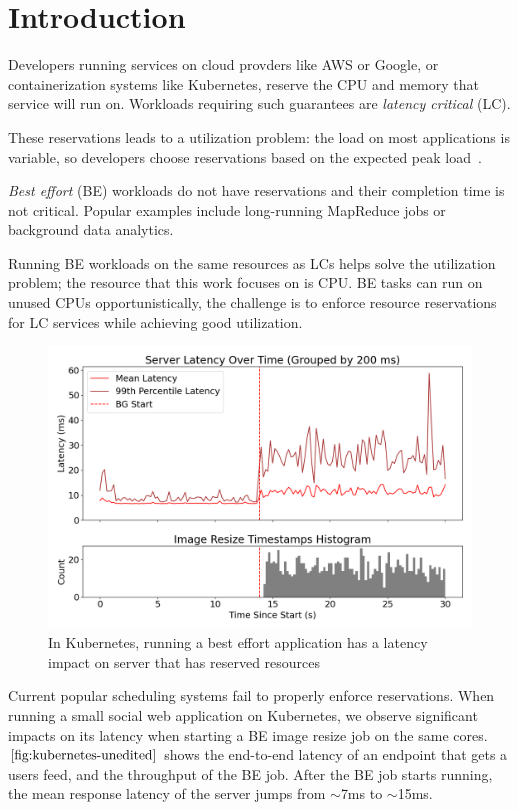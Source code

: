 \section{Introduction}

Developers running services on cloud provders like AWS or Google, or
containerization systems like Kubernetes, reserve the CPU and memory that service
will run on. Workloads requiring such guarantees are \textit{latency critical}
(LC).

These reservations leads to a utilization problem: the load on most applications
is variable, so developers choose reservations based on the expected peak
load~\cite{borg, nu, overprovision}.

\textit{Best effort} (BE) workloads do not have reservations and their
completion time is not critical. Popular examples include long-running MapReduce
jobs or background data analytics.

Running BE workloads on the same resources as LCs helps solve the utilization
problem; the resource that this work focuses on is CPU. BE tasks can run on
unused CPUs opportunistically, the challenge is to enforce resource reservations
for LC services while achieving good utilization.

\begin{figure}[t]
    \centering
    \includegraphics[width=\columnwidth]{graphs/kubernetes-unedited.png}
    \caption{In Kubernetes, running a best effort application has a latency
    impact on server that has reserved resources}\label{fig:kubernetes-unedited}
\end{figure}

Current popular scheduling systems fail to properly enforce reservations. When
running a small social web application on Kubernetes, we observe significant
impacts on its latency when starting a BE image resize job on the same cores.
$\autoref{fig:kubernetes-unedited}$ shows the end-to-end latency of an endpoint
that gets a users feed, and the throughput of the BE job. After the BE job
starts running, the mean response latency of the server jumps from $\sim$7ms to
$\sim$15ms.



